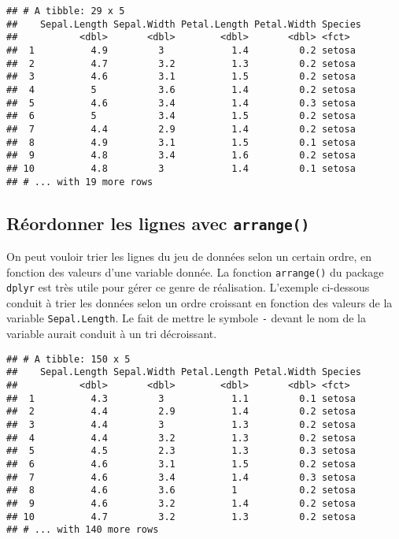 \documentclass[
  french,
]{book}
\newenvironment{Shaded}{\begin{snugshade}}{\end{snugshade}}
\newcommand{\KeywordTok}[1]{\textcolor[rgb]{0.13,0.29,0.53}{\textbf{#1}}}
\newcommand{\NormalTok}[1]{#1}
\newcommand{\OperatorTok}[1]{\textcolor[rgb]{0.81,0.36,0.00}{\textbf{#1}}}
\newcommand{\StringTok}[1]{\textcolor[rgb]{0.31,0.60,0.02}{#1}}
\begin{document}
\begin{verbatim}
## # A tibble: 29 x 5
##    Sepal.Length Sepal.Width Petal.Length Petal.Width Species
##           <dbl>       <dbl>        <dbl>       <dbl> <fct>  
##  1          4.9         3            1.4         0.2 setosa 
##  2          4.7         3.2          1.3         0.2 setosa 
##  3          4.6         3.1          1.5         0.2 setosa 
##  4          5           3.6          1.4         0.2 setosa 
##  5          4.6         3.4          1.4         0.3 setosa 
##  6          5           3.4          1.5         0.2 setosa 
##  7          4.4         2.9          1.4         0.2 setosa 
##  8          4.9         3.1          1.5         0.1 setosa 
##  9          4.8         3.4          1.6         0.2 setosa 
## 10          4.8         3            1.4         0.1 setosa 
## # ... with 19 more rows
\end{verbatim}

\hypertarget{ruxe9ordonner-les-lignes-avec-arrange}{%
\subsection{\texorpdfstring{Réordonner les lignes avec \texttt{arrange()}}{Réordonner les lignes avec arrange()}}\label{ruxe9ordonner-les-lignes-avec-arrange}}

On peut vouloir trier les lignes du jeu de données selon un certain ordre, en fonction des valeurs d'une variable donnée. La fonction \texttt{arrange()} du package \texttt{dplyr} est très utile pour gérer ce genre de réalisation. L'exemple ci-dessous conduit à trier les données selon un ordre croissant en fonction des valeurs de la variable \texttt{Sepal.Length}. Le fait de mettre le symbole \texttt{-} devant le nom de la variable aurait conduit à un tri décroissant.

\begin{Shaded}
\end{Shaded}

\begin{verbatim}
## # A tibble: 150 x 5
##    Sepal.Length Sepal.Width Petal.Length Petal.Width Species
##           <dbl>       <dbl>        <dbl>       <dbl> <fct>  
##  1          4.3         3            1.1         0.1 setosa 
##  2          4.4         2.9          1.4         0.2 setosa 
##  3          4.4         3            1.3         0.2 setosa 
##  4          4.4         3.2          1.3         0.2 setosa 
##  5          4.5         2.3          1.3         0.3 setosa 
##  6          4.6         3.1          1.5         0.2 setosa 
##  7          4.6         3.4          1.4         0.3 setosa 
##  8          4.6         3.6          1           0.2 setosa 
##  9          4.6         3.2          1.4         0.2 setosa 
## 10          4.7         3.2          1.3         0.2 setosa 
## # ... with 140 more rows
\end{verbatim}
\end{document}
